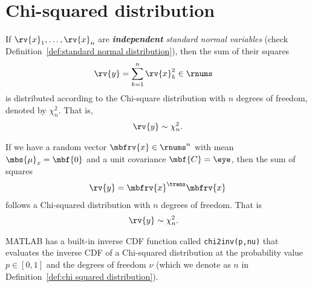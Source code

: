 \section{Chi-squared distribution}
\begin{definitionBox}
    \label{def:chi squared distribution}
    If $\rv{x}_{1}, \ldots, \rv{x}_{n}$ are \emph{\textbf{independent} standard normal variables} (check Definition~\ref{def:standard normal distribution}), then the sum of their squares 
    \begin{align}
        \rv{y} &= \sum_{k=1}^{n}\rv{x}_{k}^{2} \in \rnums
    \end{align}
    is distributed according to the Chi-square distribution with $n$ degrees of freedom, denoted by $\chi_{n}^{2}$. That is,
    \begin{align}
        \rv{y}\sim\chi^{2}_{n}.
    \end{align}
\end{definitionBox}
%
\begin{myremark}
    If we have a random vector $\mbfrv{x}\in\rnums^{n}$ with mean $\mbs{\mu}_{x}=\mbf{0}$ and a unit covariance $\mbf{C}=\eye$, then the sum of squares    
    \begin{align}
        \rv{y} &= \mbfrv{x}^{\trans}\mbfrv{x}\\        
    \end{align}
    follows a Chi-squared distribution with $n$ degrees of freedom. That is
    \begin{align}
        \rv{y} &\sim\chi^{2}_{n}.
    \end{align}
\end{myremark}
%
\begin{myremark}
    MATLAB has a built-in inverse CDF function called \texttt{chi2inv(p,nu)} that evaluates the inverse CDF of a Chi-squared distribution at the probability value $p\in[0,1]$ and the degrees of freedom $\nu$ (which we denote as $n$ in Definition~\ref{def:chi squared distribution}). 
\end{myremark}

